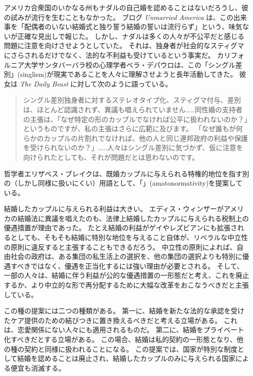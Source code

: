 \documentclass[paper=a4,book,openany]{jlreq} \usepackage{mystyle}
\begin{document}
アメリカ合衆国のいかなる州もナダルの自己婚を認めることはないだろうし、彼の試みが流行を生むこともなかった。
ブログ \emph{Unmarried America} は、この出来事を「配偶者のいない結婚式と独り誓う結婚の誓いは流行らず」という、味気ないが正確な見出しで報じた\citep{coleman07:_spous_weddin_solo_vows_not_catch}。
しかし、ナダルは多くの人々が不公平だと感じる問題に注意を向けさせようとしていた。
それは、独身者が社会的なスティグマにさらされるだけでなく、法的な不利益も受けているという事実だ。
カリフォルニア大学サンタバーバラ校の心理学者ベラ・デパウロは、この「シングル差別」(singlism)が現実であることを人々に理解させようと長年活動してきた。
彼女は \emph{The Daily Beast} に対して次のように語っている。

\begin{quote}
  シングル差別{\DDASH}独身者に対するステレオタイプ化、スティグマ付与、差別{\DDASH}は、ほとんど認識されず、異議も唱えられていません……同性婚の支持者の主張は、「なぜ特定の形のカップルでなければ公平に扱われないのか？」というものですが、私の主張はさらに広範に及びます。
「なぜ誰もが何らかのカップルの片割れでなければ、他の人と同じ連邦政府の利益や保護を受けられないのか？」……人々はシングル差別に気づかず、仮に注意を向けられたとしても、それが問題だとは思わないのです。
\citep{kelly12:_singl_out}

\end{quote}

哲学者エリザベス・ブレイクは、既婚カップルに与えられる特権的地位を指す別の（しかし同様に扱いにくい）用語として、「」(amatonormativity)を提案している。

結婚したカップルに与えられる利益は大きい\citep[pp.380--381]{sunstein08:_privat_marriag}。
エディス・ウィンザーがアメリカの結婚法に異議を唱えたのも、法律上結婚したカップルに与えられる税制上の優遇措置が理由であった。
たとえ結婚の利益がゲイやレズビアンにも拡張されるとしても、そもそも結婚に特別な地位を与えること自体が、リベラルな中立性の原則に違反すると主張することもできるだろう。
中立性の原則によれば、自由社会の政府は、ある集団の私生活上の選択を、他の集団の選択よりも特別に優遇すべきではなく、優遇を正当化するには強い理由が必要とされる。
そして、一部の人々は、結婚に伴う利益が公的な優遇措置の一形態だと考え、これを廃止するか、より中立的な形で再分配するために大幅な改革をおこなうべきだと主張している。

この種の提案には二つの種類がある。
第一に、結婚を新たな法的な承認を受けたケア提供のための結びつきに置き換えるべきだと考える立場がある。
これは、恋愛関係にない人々にも適用されるものだ。
第二に、結婚をプライベート化すべきだとする立場がある。
この場合、結婚は私的契約の一形態となり、他の種の契約と同様に扱われることになる。
この提案では、国家が特別な制度として結婚を認めることは廃止され、結婚したカップルのみに与えられる国家による便宜も消滅する。
\end{document}
